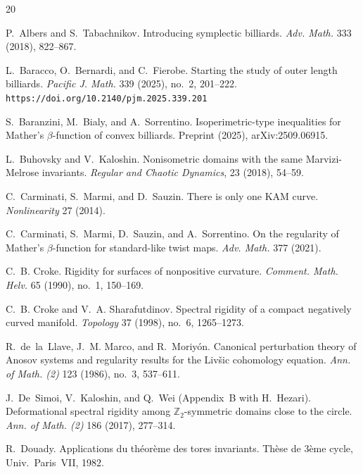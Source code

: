 \documentclass[10pt]{article}
\begin{document}
\begin{thebibliography}{20}

P.~Albers and S.~Tabachnikov.
\newblock Introducing symplectic billiards.
\newblock \emph{Adv. Math.} 333 (2018), 822--867.

L.~Baracco, O.~Bernardi, and C.~Fierobe.
\newblock Starting the study of outer length billiards.
\newblock \emph{Pacific J. Math.} 339 (2025), no.~2, 201--222.
\newblock \texttt{https://doi.org/10.2140/pjm.2025.339.201}

S.~Baranzini, M.~Bialy, and A.~Sorrentino.
\newblock Isoperimetric-type inequalities for Mather's $\beta$-function of convex billiards.
\newblock Preprint (2025), arXiv:2509.06915.

L.~Buhovsky and V.~Kaloshin.
\newblock Nonisometric domains with the same Marvizi-Melrose invariants. 
\newblock \textit{Regular and Chaotic Dynamics}, 23 (2018), 54--59.

C.~Carminati, S.~Marmi, and D.~Sauzin.
\newblock There is only one KAM curve.
\newblock \emph{Nonlinearity} 27 (2014).

C.~Carminati, S.~Marmi, D.~Sauzin, and A.~Sorrentino.
\newblock On the regularity of Mather's $\beta$-function for standard-like twist maps.
\newblock \emph{Adv. Math.} 377 (2021).

C.~B. Croke.
\newblock Rigidity for surfaces of nonpositive curvature.
\newblock \emph{Comment. Math. Helv.} 65 (1990), no.~1, 150--169.

C.~B. Croke and V.~A. Sharafutdinov.
\newblock Spectral rigidity of a compact negatively curved manifold.
\newblock \emph{Topology} 37 (1998), no.~6, 1265--1273.

R.~de~la~Llave, J.~M. Marco, and R.~Moriy\'on.
\newblock Canonical perturbation theory of Anosov systems and regularity results for the Liv\v{s}ic cohomology equation.
\newblock \emph{Ann. of Math. (2)} 123 (1986), no.~3, 537--611.

J.~De~Simoi, V.~Kaloshin, and Q.~Wei (Appendix~B with H.~Hezari).
\newblock Deformational spectral rigidity among $\mathbb Z_2$-symmetric domains close to the circle.
\newblock \emph{Ann. of Math. (2)} 186 (2017), 277--314.

R.~Douady.
\newblock Applications du théorème des tores invariants.
\newblock Thèse de 3\`eme cycle, Univ.~Paris~VII, 1982.


\end{thebibliography}
\end{document}
